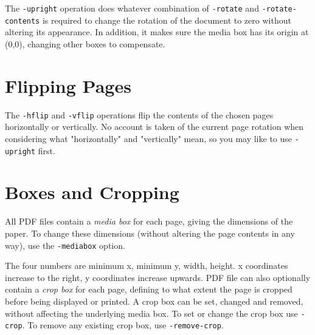 \documentclass{book}
\begin{document}
  \label{upright}
   \noindent The \texttt{-upright} operation does whatever combination of
\texttt{-rotate} and \texttt{-rotate-contents} is required to change the
rotation of the document to zero without altering its appearance. In addition, it makes sure the media box has its origin at (0,0), changing other boxes to compensate.

  \section{Flipping Pages}
  The \texttt{-hflip} and \texttt{-vflip} operations flip the contents of the
chosen pages horizontally or vertically. No account is taken of the current
page rotation when considering what "horizontally" and "vertically" mean, so you may like to use \texttt{-upright} first.

\noindent{}
  \section{Boxes and Cropping}
  All PDF files contain a \textit{media box} for each page, giving the
dimensions of the paper. To change these dimensions (without altering the page
contents in any way), use the \texttt{-mediabox} option.

\noindent{}
  \noindent The four numbers are minimum x, minimum y, width, height. x
coordinates increase to the right, y coordinates increase upwards.
  PDF file can also optionally contain a \textit{crop box} for each page,
defining to what extent the page is cropped before being displayed or printed.
A crop box can be set, changed and removed, without affecting the underlying
media box. To set or change the crop box use \texttt{-crop}. To remove any
existing crop box, use \texttt{-remove-crop}.
\end{document}
